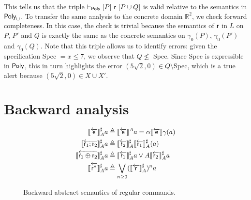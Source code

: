 \begin{example}
	This tells us that the triple $\vdash_{\mathsf{Poly}}\nobreak[P]~\mathsf{r}~[P \cup Q]$ is valid relative to the semantics in $\mathsf{Poly}_{\cup}$. To transfer the same analysis to the concrete domain $\mathbb{R}^2$, we  check forward completeness. In this case, the check is trivial because the semantics of $\mathsf{r}$ in $L$ on $P$, $P'$ and $Q$ is exactly the same as the concrete semantics on $\gamma_0(P)$, $\gamma_0(P')$ and $\gamma_0(Q)$.
	Note that this triple allows us to identify errors: given the specification Spec $= x \le 7$, we observe that $Q \nleq $ Spec. Since Spec is expressible in $\mathsf{Poly}$, this in turn highlights the error $(5 \sqrt{2}, 0) \in Q \setminus $Spec, which is a true alert because $(5 \sqrt{2}, 0) \in X \cup X'$.
\end{example}

\section{Backward analysis}

\begin{figure*}
	\begin{align*}
		\llbracket\overleftarrow{\mathsf{e}}\rrbracket^{\sharp}_{A} a                    & \triangleq \llbracket\overleftarrow{\mathsf{e}}\rrbracket^{A} a = \alpha \llbracket\overleftarrow{\mathsf{e}}\rrbracket \gamma (a)                \\
		\llbracket\overleftarrow{\mathsf{r}_1 ; \mathsf{r}_2}\rrbracket^{\sharp}_{A} a        & \triangleq \llbracket\overleftarrow{\mathsf{r}_2}\rrbracket^{\sharp}_{A} \llbracket\overleftarrow{\mathsf{r}_1}\rrbracket^{\sharp}_{A} (a)        \\
		\llbracket\overleftarrow{\mathsf{r}_1 \oplus \mathsf{r}_2}\rrbracket^{\sharp}_{A} a & \triangleq \llbracket\overleftarrow{\mathsf{r}_1}\rrbracket^{\sharp}_{A} a \vee A \llbracket\overleftarrow{\mathsf{r}_2}\rrbracket^{\sharp}_{A} a \\
		\llbracket\overleftarrow{\mathsf{r}^\star}\rrbracket^{\sharp}_{A} a             & \triangleq \bigvee_{n \ge 0}  (\llbracket\overleftarrow{\mathsf{r}}\rrbracket^{\sharp}_{A})^n a
	\end{align*}
	\caption{Backward abstract semantics of regular commands.}
	\label{fig:lcla:regcom-abs-sem-bw}
\end{figure*}

